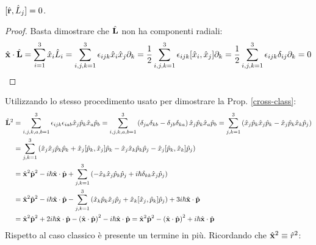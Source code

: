 \begin{proposition}\label{r-l-comm}
	$ [ \hat{\mathbf{r}}, \hat{L}_j ] = 0 $.
\end{proposition}
\begin{proof}
	Basta dimostrare che $ \hat{\mathbf{L}} $ non ha componenti radiali:
	\begin{equation*}
		\hat{\mathbf{x}}\cdot\hat{\mathbf{L}} = \sum_{i = 1}^{3} \hat{x}_i \hat{L}_i = \sum_{i,j,k = 1}^{3} \epsilon_{ijk} \hat{x}_i \hat{x}_j \partial_k = \frac{1}{2} \sum_{i,j,k = 1}^{3} \epsilon_{ijk} [\hat{x}_i,\hat{x}_j] \partial_k = \frac{1}{2} \sum_{i,j,k = 1}^{3} \epsilon_{ijk} \delta_{ij} \partial_k = 0
	\end{equation*}
\end{proof}
Utilizzando lo stesso procedimento usato per dimostrare la Prop. \ref{cross-class}:
\begin{equation*}
	\begin{split}
		\hat{\mathbf{L}}^2
		&= \sum_{i,j,k,a,b = 1}^{3} \epsilon_{ijk} \epsilon_{iab} \hat{x}_j \hat{p}_k \hat{x}_a \hat{p}_b = \sum_{i,j,k,a,b = 1}^{3} \left( \delta_{ja}\delta_{kb} - \delta_{jb}\delta_{ka} \right) \hat{x}_j \hat{p}_k \hat{x}_a \hat{p}_b = \sum_{j,k = 1}^{3} \left( \hat{x}_j \hat{p}_k \hat{x}_j \hat{p}_k - \hat{x}_j \hat{p}_k \hat{x}_k \hat{p}_j \right)\\
		&= \sum_{j,k = 1}^{3} \left( \hat{x}_j \hat{x}_j \hat{p}_k \hat{p}_k + \hat{x}_j [\hat{p}_k,\hat{x}_j] \hat{p}_k - \hat{x}_j \hat{x}_k \hat{p}_k \hat{p}_j - \hat{x}_j [\hat{p}_k,\hat{x}_k]\hat{p}_j \right)\\
		&= \hat{\mathbf{x}}^2 \hat{\mathbf{p}}^2 - i\hbar \hat{\mathbf{x}}\cdot\hat{\mathbf{p}} + \sum_{j,k = 1}^{3} \left( - \hat{x}_k \hat{x}_j \hat{p}_k \hat{p}_j + i\hbar \delta_{kk} \hat{x}_j \hat{p}_j \right)\\
		&= \hat{\mathbf{x}}^2 \hat{\mathbf{p}}^2 - i\hbar \hat{\mathbf{x}}\cdot\hat{\mathbf{p}} - \sum_{j,k = 1}^{3} \left( \hat{x}_k \hat{p}_k \hat{x}_j \hat{p}_j + \hat{x}_k [\hat{x}_j,\hat{p}_k] \hat{p}_j \right) + 3i\hbar \hat{\mathbf{x}}\cdot\hat{\mathbf{p}}\\
		&= \hat{\mathbf{x}}^2 \hat{\mathbf{p}}^2 + 2i\hbar\hat{\mathbf{x}}\cdot\hat{\mathbf{p}} - \left( \hat{\mathbf{x}}\cdot\hat{\mathbf{p}} \right)^2 - i\hbar\hat{\mathbf{x}}\cdot\hat{\mathbf{p}} = \hat{\mathbf{x}}^2 \hat{\mathbf{p}}^2 - \left( \hat{\mathbf{x}}\cdot\hat{\mathbf{p}} \right)^2 + i\hbar \hat{\mathbf{x}}\cdot\hat{\mathbf{p}}
	\end{split}
\end{equation*}
Rispetto al caso classico è presente un termine in più. Ricordando che $ \hat{\mathbf{x}}^2 \equiv \hat{r}^2 $:

